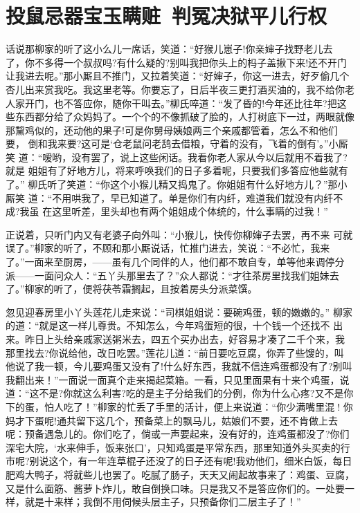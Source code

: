 \chapter{投鼠忌器宝玉瞒赃~判冤决狱平儿行权}

话说那柳家的听了这小么儿一席话，笑道：“好猴儿崽子!你亲婶子找野老儿去
了，你不多得一个叔叔吗?有什么疑的?别叫我把你头上的杩子盖揪下来!还不开门
让我进去呢。”那小厮且不推门，又拉着笑道：“好婶子，你这一进去，好歹偷几个
杏儿出来赏我吃。我这里老等。你要忘了，日后半夜三更打酒买油的，我不给你老
人家开门，也不答应你，随你干叫去。”柳氏啐道：“发了昏的!今年还比往年?把这
些东西都分给了众妈妈了。一个个的不像抓破了脸的，人打树底下一过，两眼就像
那黧鸡似的，还动他的果子!可是你舅母姨娘两三个亲戚都管着，怎么不和他们要，
倒和我来要?这可是‘仓老鼠问老鸹去借粮，守着的没有，飞着的倒有’。”小厮笑
道：“嗳哟，没有罢了，说上这些闲话。我看你老人家从今以后就用不着我了?就是
姐姐有了好地方儿，将来呼唤我们的日子多着呢，只要我们多答应他些就有了。”
柳氏听了笑道：“你这个小猴儿精又捣鬼了。你姐姐有什么好地方儿？”那小厮笑
道：“不用哄我了，早已知道了。单是你们有内纤，难道我们就没有内纤不成?我虽
在这里听差，里头却也有两个姐姐成个体统的，什么事瞒的过我！”

正说着，只听门内又有老婆子向外叫：“小猴儿，快传你柳婶子去罢，再不来
可就误了。”柳家的听了，不顾和那小厮说话，忙推门进去，笑说：“不必忙，我来
了。”一面来至厨房，——虽有几个同伴的人，他们都不敢自专，单等他来调停分
派——一面问众人：“五丫头那里去了？”众人都说：“才往茶房里找我们姐妹去
了。”柳家的听了，便将茯苓霜搁起，且按着房头分派菜馔。

忽见迎春房里小丫头莲花儿走来说：“司棋姐姐说：要碗鸡蛋，顿的嫩嫩的。”
柳家的道：“就是这一样儿尊贵。不知怎么，今年鸡蛋短的很，十个钱一个还找不
出来。昨日上头给亲戚家送粥米去，四五个买办出去，好容易才凑了二千个来，我
那里找去?你说给他，改日吃罢。”莲花儿道：“前日要吃豆腐，你弄了些馊的，叫
他说了我一顿，今儿要鸡蛋又没有了!什么好东西，我就不信连鸡蛋都没有了?别叫
我翻出来！”一面说一面真个走来揭起菜箱。一看，只见里面果有十来个鸡蛋，说
道：“这不是?你就这么利害?吃的是主子分给我们的分例，你为什么心疼?又不是你
下的蛋，怕人吃了！”柳家的忙丢了手里的活计，便上来说道：“你少满嘴里混!
你妈才下蛋呢!通共留下这几个，预备菜上的飘马儿，姑娘们不要，还不肯做上去
呢：预备遇急儿的。你们吃了，倘或一声要起来，没有好的，连鸡蛋都没了?你们
深宅大院，‘水来伸手，饭来张口’，只知鸡蛋是平常东西，那里知道外头买卖的行
市呢?别说这个，有一年连草棍子还没了的日子还有呢!我劝他们，细米白饭，每日
肥鸡大鸭子，将就些儿也罢了。吃腻了肠子，天天又闹起故事来了：鸡蛋、豆腐，
又是什么面筋、酱萝卜炸儿，敢自倒换口味。只是我又不是答应你们的。一处要一
样，就是十来样；我倒不用伺候头层主子，只预备你们二层主子了！”

